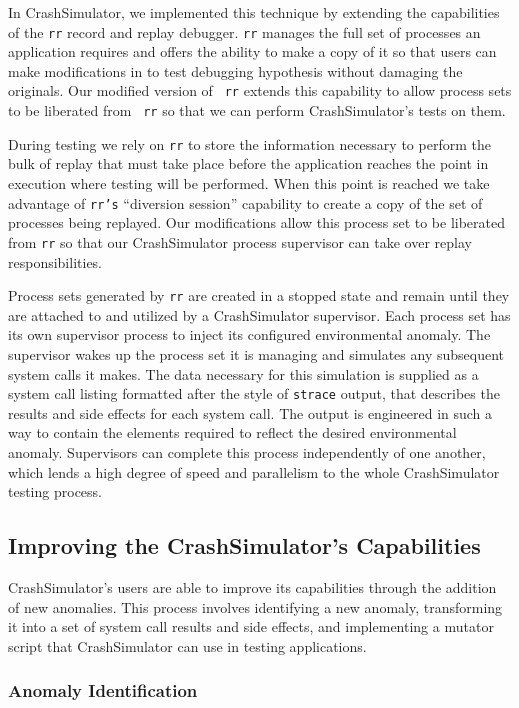In CrashSimulator, we implemented this technique by extending the
capabilities of the {\tt rr} record and replay debugger.  {\tt rr} manages
the full set of processes an application requires and offers the ability to
make a copy of it so that users can make modifications in to test debugging
hypothesis without damaging the originals.  Our modified version of {\tt
rr} extends this capability to allow process sets to be liberated from {\tt
rr} so that we can perform CrashSimulator's tests on them.

During testing we rely on {\tt rr}
to store the information necessary to perform the bulk of
replay that must take place before the application reaches the point in
execution where testing will be performed.  When this point is reached we
take advantage of {\tt rr's} ``diversion session'' capability to create a
copy of the set of processes being replayed.  Our modifications
allow this process set to be liberated from {\tt rr} so that our
CrashSimulator process supervisor can take over replay responsibilities.

Process sets generated by {\tt rr} are created in a stopped state and
remain until they are attached to and utilized by a CrashSimulator
supervisor.  Each process set has its own supervisor process to inject
its configured environmental anomaly.  The
supervisor wakes up the process set it is managing and simulates any
subsequent system calls it makes.  The data necessary for this
simulation is
supplied as a system call listing formatted after the style of {\tt strace}
output, that describes the results and side effects for each system
call. The output is engineered in such a way to contain the
elements required to reflect the
desired environmental anomaly.  Supervisors can complete this
process independently of one another, which lends a
high degree of speed and
parallelism to the whole CrashSimulator testing process.

\subsection{Improving the CrashSimulator's Capabilities}

CrashSimulator's users are able to improve its capabilities through
the addition of new anomalies.  This process involves identifying a new
anomaly, transforming it into a set of system call results and side
effects, and implementing a mutator script that CrashSimulator can use in
testing applications.

\subsubsection{Anomaly Identification} \label{subsec:anomalyidentification}

